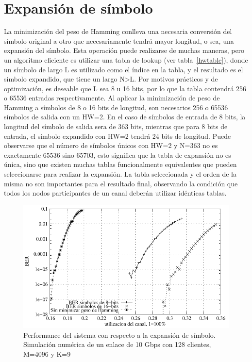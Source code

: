 \section{Expansión de símbolo}
La minimización del peso de Hamming conlleva una necesaria conversión del símbolo original a otro que necesariamente tendrá mayor longitud, o sea, una expansión del símbolo.
Esta operación puede realizarse de muchas maneras, pero un algoritmo eficiente es utilizar una tabla de lookup (ver tabla~\ref{hwtable}), donde un símbolo de largo L es utilizado como el índice en la tabla, y el resultado es el símbolo expandido, que tiene un largo N\textgreater L.
Por motivos prácticos y de optimización, es deseable que L sea 8 u 16 bits, por lo que la tabla contendrá 256 o 65536 entradas respectivamente.
Al aplicar la minimización de peso de Hamming a símbolos de 8 o 16 bits de longitud, son necesarios 256 o 65536 símbolos de salida con un HW=2. En el caso de símbolos de entrada de 8 bits, la longitud del símbolo de salida sera de 363 bits, mientras que para 8 bits de entrada, el símbolo expandido con HW=2 tendrá 24 bits de longitud.
Puede observarse que el número de símbolos únicos con HW=2 y N=363 no es exactamente 65536 sino 65703, esto significa que la tabla de expansión no es única, sino que existen muchas tablas funcionalmente equivalentes que pueden seleccionarse para realizar la expansión.
La tabla seleccionada y el orden de la misma no son importantes para el resultado final, observando la condición que todos los nodos participantes de un canal deberán utilizar idénticas tablas.
\begin{figure}[!t]
  \centering
    \includegraphics[width=6in]{graphs/BERvsChannelES2}
    \caption{Performance del sistema con respecto a la expansión de símbolo. Simulación numérica de un enlace de 10 Gbps con 128 clientes, M=4096 y K=9}
    \label{BERvsExpansion}
\end{figure}


